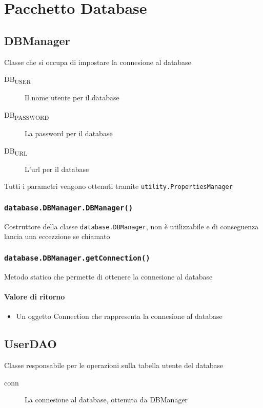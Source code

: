 \section{Pacchetto Database}
\label{sec:package_database}

\subsection{DBManager}
Classe che si occupa di impostare la connesione al database
\begin{description}
\item[DB\textsubscript{USER}]  Il nome utente per il database
\item[DB\textsubscript{PASSWORD}] La password per il database
\item[DB\textsubscript{URL}]  L'url per il database
\end{description}
Tutti i parametri vengono ottenuti tramite \texttt{utility.PropertiesManager}
\subsubsection{\texttt{database.DBManager.DBManager()}}
Costruttore della classe \texttt{database.DBManager}, non è utilizzabile e di conseguenza
lancia una eccezzione se chiamato

\subsubsection{\texttt{database.DBManager.getConnection()}}
Metodo statico che permette di ottenere la connesione al database
\paragraph{Valore di ritorno}
\begin{itemize}
\item Un oggetto Connection che rappresenta la connesione al database
\end{itemize}


\subsection{UserDAO} Classe responsabile per le operazioni sulla
tabella utente del database
\begin{description}
\item[conn] La connesione al database, ottenuta da DBManager
\end{description}

